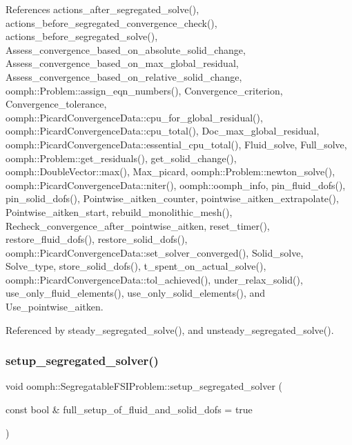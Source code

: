References actions\+\_\+after\+\_\+segregated\+\_\+solve(), actions\+\_\+before\+\_\+segregated\+\_\+convergence\+\_\+check(), actions\+\_\+before\+\_\+segregated\+\_\+solve(), Assess\+\_\+convergence\+\_\+based\+\_\+on\+\_\+absolute\+\_\+solid\+\_\+change, Assess\+\_\+convergence\+\_\+based\+\_\+on\+\_\+max\+\_\+global\+\_\+residual, Assess\+\_\+convergence\+\_\+based\+\_\+on\+\_\+relative\+\_\+solid\+\_\+change, oomph\+::\+Problem\+::assign\+\_\+eqn\+\_\+numbers(), Convergence\+\_\+criterion, Convergence\+\_\+tolerance, oomph\+::\+Picard\+Convergence\+Data\+::cpu\+\_\+for\+\_\+global\+\_\+residual(), oomph\+::\+Picard\+Convergence\+Data\+::cpu\+\_\+total(), Doc\+\_\+max\+\_\+global\+\_\+residual, oomph\+::\+Picard\+Convergence\+Data\+::essential\+\_\+cpu\+\_\+total(), Fluid\+\_\+solve, Full\+\_\+solve, oomph\+::\+Problem\+::get\+\_\+residuals(), get\+\_\+solid\+\_\+change(), oomph\+::\+Double\+Vector\+::max(), Max\+\_\+picard, oomph\+::\+Problem\+::newton\+\_\+solve(), oomph\+::\+Picard\+Convergence\+Data\+::niter(), oomph\+::oomph\+\_\+info, pin\+\_\+fluid\+\_\+dofs(), pin\+\_\+solid\+\_\+dofs(), Pointwise\+\_\+aitken\+\_\+counter, pointwise\+\_\+aitken\+\_\+extrapolate(), Pointwise\+\_\+aitken\+\_\+start, rebuild\+\_\+monolithic\+\_\+mesh(), Recheck\+\_\+convergence\+\_\+after\+\_\+pointwise\+\_\+aitken, reset\+\_\+timer(), restore\+\_\+fluid\+\_\+dofs(), restore\+\_\+solid\+\_\+dofs(), oomph\+::\+Picard\+Convergence\+Data\+::set\+\_\+solver\+\_\+converged(), Solid\+\_\+solve, Solve\+\_\+type, store\+\_\+solid\+\_\+dofs(), t\+\_\+spent\+\_\+on\+\_\+actual\+\_\+solve(), oomph\+::\+Picard\+Convergence\+Data\+::tol\+\_\+achieved(), under\+\_\+relax\+\_\+solid(), use\+\_\+only\+\_\+fluid\+\_\+elements(), use\+\_\+only\+\_\+solid\+\_\+elements(), and Use\+\_\+pointwise\+\_\+aitken.



Referenced by steady\+\_\+segregated\+\_\+solve(), and unsteady\+\_\+segregated\+\_\+solve().

\mbox{\label{classoomph_1_1SegregatableFSIProblem_a12e662227e5daf656244a531f40022f9}} 
\subsubsection{\texorpdfstring{setup\+\_\+segregated\+\_\+solver()}{setup\_segregated\_solver()}}
{\footnotesize\ttfamily void oomph\+::\+Segregatable\+F\+S\+I\+Problem\+::setup\+\_\+segregated\+\_\+solver (\begin{DoxyParamCaption}\item[{const bool \&}]{full\+\_\+setup\+\_\+of\+\_\+fluid\+\_\+and\+\_\+solid\+\_\+dofs = {\ttfamily true} }\end{DoxyParamCaption})}




